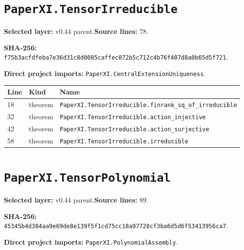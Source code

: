 \documentclass[10pt,oneside]{book}
\begin{document}
\section{\texorpdfstring{\nolinkurl{PaperXI.TensorIrreducible}}{PaperXI.TensorIrreducible}}\label{module:PaperXI.TensorIrreducible}

\textbf{Selected layer:} v0.44 parent.\quad\textbf{Source lines:} 78.\par\textbf{SHA-256:} {\scriptsize\nolinkurl{f75b3acfdfeba7e36d31c8d0085caffec072b5c712c4b76f407d8a0b65d5f721}}.


\textbf{Direct project imports:} \nolinkurl{PaperXI.CentralExtensionUniqueness}.

\begin{longtable}{@{}p{}p{}p{}@{}}\toprule Line&Kind&Name\\\midrule\endhead

18&theorem&\nolinkurl{PaperXI.TensorIrreducible.finrank_sq_of_irreducible}\\

32&theorem&\nolinkurl{PaperXI.TensorIrreducible.action_injective}\\

42&theorem&\nolinkurl{PaperXI.TensorIrreducible.action_surjective}\\

58&theorem&\nolinkurl{PaperXI.TensorIrreducible.irreducible}\\

\bottomrule\end{longtable}

\section{\texorpdfstring{\nolinkurl{PaperXI.TensorPolynomial}}{PaperXI.TensorPolynomial}}\label{module:PaperXI.TensorPolynomial}

\textbf{Selected layer:} v0.44 parent.\quad\textbf{Source lines:} 89.\par\textbf{SHA-256:} {\scriptsize\nolinkurl{45345b4d384aa9e69de8e139f5f1cd75cc18a97728cf3ba6d5d6f53413956ca7}}.


\textbf{Direct project imports:} \nolinkurl{PaperXI.PolynomialAssembly}.
\end{document}

